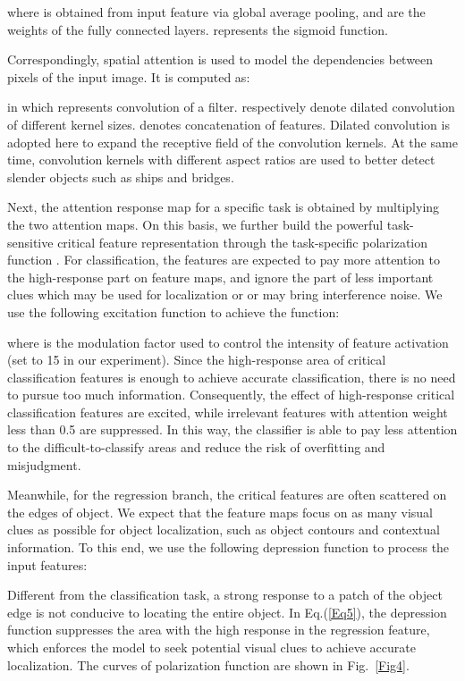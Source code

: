 \documentclass[journal]{IEEEtran}
\begin{document}
where  is obtained from input feature  via global average pooling,  and  are the weights of the fully connected layers.  represents the sigmoid function. 

Correspondingly, spatial attention is used to model the dependencies between pixels of the input image. It is computed as:

in which  represents convolution of a  filter.  respectively denote dilated convolution of different kernel sizes.  denotes concatenation of features. Dilated convolution is adopted here to expand the receptive field of the convolution kernels. At the same time, convolution kernels with different aspect ratios are used to better detect slender objects such as ships and bridges.

Next, the attention response map  for a specific task is obtained by multiplying the two attention maps. On this basis, we further build the powerful task-sensitive critical feature representation through the task-specific polarization function . For classification, the features are expected to pay more attention to the high-response part on feature maps, and ignore the part of less important clues which may be used for localization or or may bring interference noise. We use the following excitation function to achieve the function:

where  is the modulation factor used to control the intensity of feature activation (set to 15 in our experiment). Since the high-response area of critical classification features is enough to achieve accurate classification, there is no need to pursue too much information. Consequently, the effect of high-response critical classification features are excited, while irrelevant features with attention weight less than 0.5 are suppressed. In this way, the classifier is able to pay less attention to the difficult-to-classify areas and reduce the risk of overfitting and misjudgment.

Meanwhile, for the regression branch, the critical features are often scattered on the edges of object. We expect that the feature maps focus on as many visual clues as possible for object localization, such as object contours and contextual information. To this end, we use the following depression function to process the input features:

Different from the classification task, a strong response to a patch of the object edge is not conducive to locating the entire object. In Eq.(\ref{Eq5}), the depression function suppresses the area with the high response in the regression feature, which enforces the model to seek potential visual clues to achieve accurate localization. The curves of polarization function  are shown in Fig.~\ref{Fig4}. 
\end{document}
